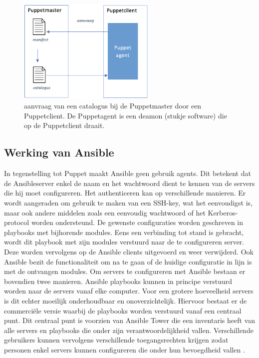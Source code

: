 \begin{figure}  \begin{center}
  \includegraphics[width=250px]{img/aanvraagCatalogus.png}
 \end{center}\caption{aanvraag van een catalogus bij de Puppetmaster door een Puppetclient. De Puppetagent is een deamon (stukje software) die op de Puppetclient draait.}  
  \label{fig:aanvraagCatalogus}
\end{figure}


\subsection{Werking van Ansible}

In tegenstelling tot Puppet maakt Ansible geen gebruik agents. Dit betekent dat de Ansibleserver enkel de naam en het wachtwoord dient te kennen van de servers die hij moet configureren. Het authenticeren kan op verschillende manieren. Er wordt aangeraden om gebruik te maken van een SSH-key, wat het eenvoudigst is, maar ook andere middelen zoals een eenvoudig wachtwoord of het Kerberos-protocol worden ondersteund. De gewenste configuraties worden geschreven in playbooks met bijhorende modules. Eens een verbinding tot stand is gebracht, wordt dit playbook met zijn modules verstuurd naar de te configureren server. Deze worden vervolgens op de Ansible clients uitgevoerd  en weer verwijderd. Ook Ansible bezit de functionaliteit om na te gaan of de huidige configuratie in lijn is met de ontvangen modules. Om servers te configureren met Ansible bestaan er bovendien twee manieren. Ansible playbooks kunnen in principe verstuurd worden naar de servers vanaf elke computer. Voor een grotere hoeveelheid servers is dit echter moeilijk onderhoudbaar en onoverzichtelijk. Hiervoor bestaat er de commerci\"ele versie waarbij de playbooks worden verstuurd vanaf een centraal punt. Dit centraal punt is voorzien van Ansible Tower die een inventaris heeft van alle servers en playbooks die onder zijn verantwoordelijkheid vallen. Verschillende gebruikers kunnen vervolgens verschillende toegangsrechten krijgen zodat personen enkel servers kunnen configureren die onder hun bevoegdheid vallen \autocite{ansibledoc}.

